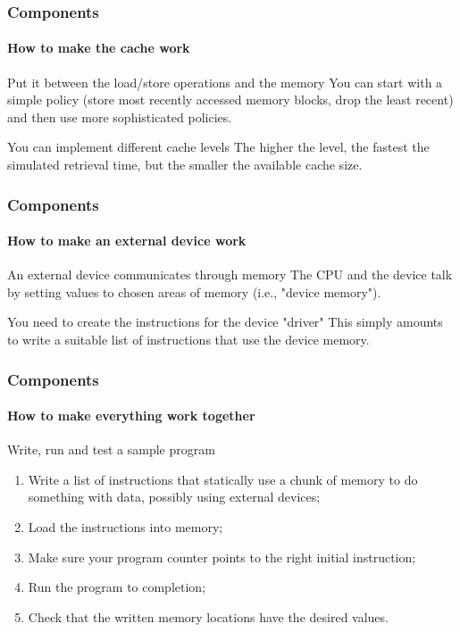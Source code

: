 \begin{frame}
\frametitle{Components}
\framesubtitle{How to make the cache work}

\begin{block}{Put it between the load/store operations and the memory}
You can start with a simple policy (store most recently accessed memory blocks, drop the least recent) and then use more sophisticated policies.
\end{block}
\pause
\begin{block}{You can implement different cache levels}
The higher the level, the fastest the simulated retrieval time, but the smaller the available cache size.
\end{block}
\end{frame}

\begin{frame}
\frametitle{Components}
\framesubtitle{How to make an external device work}

\begin{block}{An external device communicates through memory}
The CPU and the device talk by setting values to chosen areas of memory (i.e., "device memory").
\end{block}
\pause
\begin{block}{You need to create the instructions for the device "driver"}
This simply amounts to write a suitable list of instructions that use the device memory.
\end{block}
\end{frame}

\begin{frame}
\frametitle{Components}
\framesubtitle{How to make everything work together}

\begin{block}{Write, run and test a sample program}
\begin{enumerate}
\item Write a list of instructions that statically use a chunk of memory to do something with data, possibly using external devices;
\item Load the instructions into memory;
\item Make sure your program counter points to the right initial instruction;
\item Run the program to completion;
\item Check that the written memory locations have the desired values.
\end{enumerate}
\end{block}
\end{frame}

